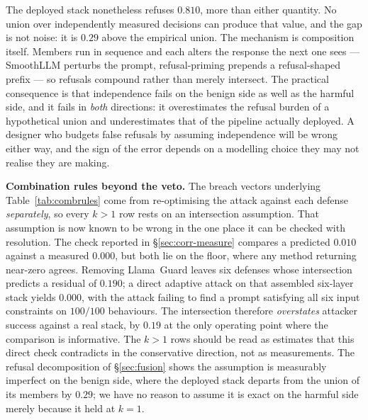 The deployed stack nonetheless refuses $0.810$, more than either quantity. No union over
independently measured decisions can produce that value, and the gap is not noise: it is
$0.29$ above the empirical union. The mechanism is composition itself. Members run in
sequence and each alters the response the next one sees --- SmoothLLM perturbs the prompt,
refusal-priming prepends a refusal-shaped prefix --- so refusals compound rather than merely
intersect. The practical consequence is that independence fails on the benign side as well as
the harmful side, and it fails in \emph{both} directions: it overestimates the refusal burden
of a hypothetical union and underestimates that of the pipeline actually deployed. A designer
who budgets false refusals by assuming independence will be wrong either way, and the sign of
the error depends on a modelling choice they may not realise they are making.


\textbf{Combination rules beyond the veto.} The breach vectors underlying
Table~\ref{tab:combrules} come from re-optimising the attack against each defense
\emph{separately}, so every $k>1$ row rests on an intersection assumption. That assumption is
now known to be wrong in the one place it can be checked with resolution. The check reported
in \S\ref{sec:corr-measure} compares a predicted $0.010$ against a measured $0.000$, but both
lie on the floor, where any method returning near-zero agrees. Removing Llama~Guard leaves six
defenses whose intersection predicts a residual of $0.190$; a direct adaptive attack on that
assembled six-layer stack yields $0.000$, with the attack failing to find a prompt satisfying
all six input constraints on $100/100$ behaviours. The intersection therefore \emph{overstates}
attacker success against a real stack, by $0.19$ at the only operating point where the
comparison is informative. The $k>1$ rows should be read as estimates that this direct check
contradicts in the conservative direction, not as measurements. The refusal decomposition of \S\ref{sec:fusion} shows the
assumption is measurably imperfect on the benign side, where the deployed stack departs from
the union of its members by $0.29$; we have no reason to assume it is exact on the harmful
side merely because it held at $k=1$.
